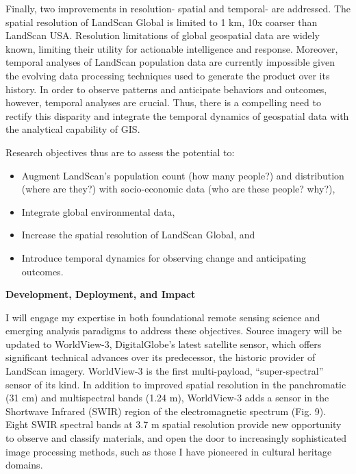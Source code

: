 \documentclass[letterpaper,sans]{moderncv}
\begin{document}
\begin{paracol}{2}
\begin{leftcolumn}
Finally, two improvements in resolution- spatial and temporal- are addressed. The spatial resolution of LandScan Global is limited to 1 km, 10x coarser than LandScan USA. Resolution limitations of global geospatial data are widely known, limiting their utility for actionable intelligence and response.  Moreover, temporal analyses of LandScan population data are currently impossible given the evolving data processing techniques used to generate the product over its history. 
In order to observe patterns and anticipate behaviors and outcomes, however, temporal analyses are crucial. Thus, there is a compelling need to rectify this disparity and integrate the temporal dynamics of geospatial data with the analytical capability of GIS. 
\vspace{.2cm}

Research objectives thus are to assess the potential to: 
\begin{itemize}
\item Augment LandScan's population count (how many people?) and distribution (where are they?) with socio-economic data (who are these people? why?), 
\item Integrate global environmental data, 
\item Increase the spatial resolution of LandScan Global, and 
\item Introduce temporal dynamics for observing change and anticipating outcomes.
\end{itemize}
\vspace{.2cm}

\textbf{Development, Deployment, and Impact}
\vspace{.2cm}
 

I will engage my expertise in both foundational remote sensing science and emerging analysis paradigms to address these objectives. Source imagery will be updated to WorldView-3, DigitalGlobe's latest satellite sensor, which offers significant technical advances over its predecessor, the historic provider of LandScan imagery. WorldView-3 is the first multi-payload, ``super-spectral'' sensor of its kind. In addition to improved spatial resolution in the panchromatic (31 cm) and multispectral bands (1.24 m), WorldView-3 adds a sensor in the Shortwave Infrared (SWIR) region of the electromagnetic spectrum (Fig. 9). Eight SWIR spectral bands at 3.7 m spatial resolution provide new opportunity to observe and classify materials, and open the door to increasingly sophisticated image processing methods, such as those I have pioneered in cultural heritage domains. 
\vspace{.2cm}


\end{leftcolumn}
\end{paracol}
\end{document}
